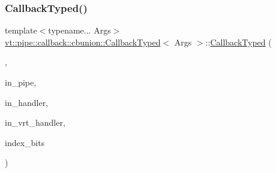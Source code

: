 \subsubsection{\texorpdfstring{Callback\+Typed()}{CallbackTyped()}\hspace{0.1cm}{\footnotesize\ttfamily [10/12]}}
{\footnotesize\ttfamily template$<$typename... Args$>$ \\
\hyperlink{structvt_1_1pipe_1_1callback_1_1cbunion_1_1_callback_typed}{vt\+::pipe\+::callback\+::cbunion\+::\+Callback\+Typed}$<$ Args $>$\+::\hyperlink{structvt_1_1pipe_1_1callback_1_1cbunion_1_1_callback_typed}{Callback\+Typed} (\begin{DoxyParamCaption}\item[{Raw\+Send\+Col\+Dir\+Tag\+Type}]{,  }\item[{\hyperlink{namespacevt_ac9852acda74d1896f48f406cd72c7bd3}{Pipe\+Type} const \&}]{in\+\_\+pipe,  }\item[{\hyperlink{namespacevt_af64846b57dfcaf104da3ef6967917573}{Handler\+Type} const}]{in\+\_\+handler,  }\item[{\hyperlink{structvt_1_1pipe_1_1callback_1_1cbunion_1_1_callback_raw_base_single_a734a9c83099de5bc1cd85f9da8dba7bb}{Auto\+Handler\+Type} const}]{in\+\_\+vrt\+\_\+handler,  }\item[{void $\ast$}]{index\+\_\+bits }\end{DoxyParamCaption})\hspace{0.3cm}{\ttfamily [inline]}}

\mbox{\label{structvt_1_1pipe_1_1callback_1_1cbunion_1_1_callback_typed_a5ac854c689dea58e9063903a460d8f9d}} 
